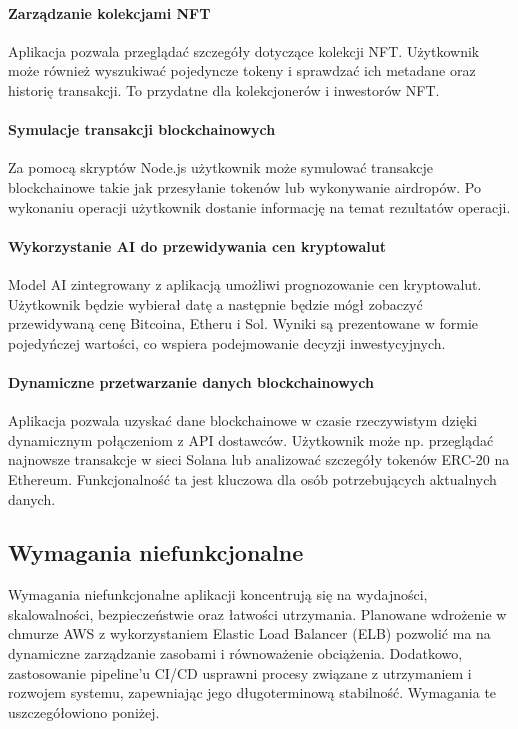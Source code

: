 \paragraph{Zarządzanie kolekcjami NFT}
Aplikacja pozwala przeglądać szczegóły dotyczące kolekcji NFT. Użytkownik może również wyszukiwać pojedyncze tokeny i sprawdzać ich metadane oraz historię transakcji. To przydatne dla kolekcjonerów i inwestorów NFT.

\paragraph{Symulacje transakcji blockchainowych}
Za pomocą skryptów Node.js użytkownik może symulować transakcje blockchainowe takie jak przesyłanie tokenów lub wykonywanie airdropów. Po wykonaniu operacji użytkownik dostanie informację na temat rezultatów operacji.

\paragraph{Wykorzystanie AI do przewidywania cen kryptowalut}
Model AI zintegrowany z aplikacją umożliwi prognozowanie cen kryptowalut. Użytkownik będzie wybierał datę a następnie będzie mógł zobaczyć przewidywaną cenę Bitcoina, Etheru i Sol. Wyniki są prezentowane w formie pojedyńczej wartości, co wspiera podejmowanie decyzji inwestycyjnych.

\paragraph{Dynamiczne przetwarzanie danych blockchainowych}
Aplikacja pozwala uzyskać dane blockchainowe w czasie rzeczywistym dzięki dynamicznym połączeniom z API dostawców. Użytkownik może np. przeglądać najnowsze transakcje w sieci Solana lub analizować szczegóły tokenów ERC-20 na Ethereum. Funkcjonalność ta jest kluczowa dla osób potrzebujących aktualnych danych.

\subsection{Wymagania niefunkcjonalne}
Wymagania niefunkcjonalne aplikacji koncentrują się na wydajności, skalowalności, bezpieczeństwie oraz łatwości utrzymania. Planowane wdrożenie w chmurze AWS z wykorzystaniem Elastic Load Balancer (ELB) pozwolić ma na dynamiczne zarządzanie zasobami i równoważenie obciążenia. Dodatkowo, zastosowanie pipeline’u CI/CD usprawni procesy związane z utrzymaniem i rozwojem systemu, zapewniając jego długoterminową stabilność. Wymagania te uszczegółowiono poniżej.

